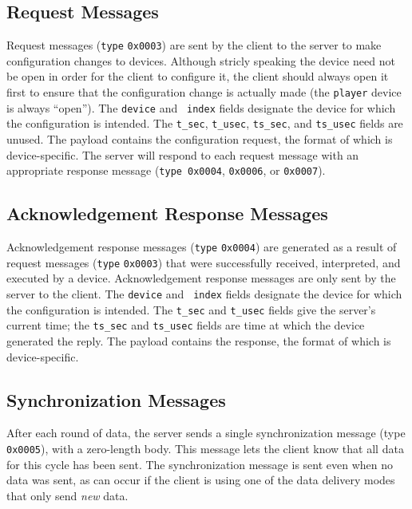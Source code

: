 \documentclass[11pt]{report}
\begin{document}
\subsection{Request Messages}
\label{sect:requestmessages}
Request messages ({\tt type} {\tt 0x0003}) are sent by the client to the server
to make configuration changes to devices.  Although stricly speaking the device
need not be open in order for the client to configure it, the client should
always open it first to ensure that the configuration change is actually made
(the {\tt player} device is always ``open'').  The {\tt device} and {\tt
index} fields designate the device for which the configuration is intended.
The {\tt t\_sec}, {\tt t\_usec}, {\tt ts\_sec}, and {\tt ts\_usec} fields
are unused.  The payload contains the configuration request, the format of
which is device-specific.  The server will respond to each request message
with an appropriate response message ({\tt type}\  {\tt 0x0004}, {\tt 0x0006},
or {\tt 0x0007}).


\subsection{Acknowledgement Response Messages}
\label{sect:ack-responsemessages}
Acknowledgement response messages ({\tt type} {\tt 0x0004}) are generated as
a result of request messages ({\tt type} {\tt 0x0003}) that were successfully
received, interpreted, and executed by a device.  Acknowledgement response
messages are only sent by the server to the client.  The {\tt device} and {\tt
index} fields designate the device for which the configuration is intended.
The {\tt t\_sec} and {\tt t\_usec} fields give the server's current time;
the {\tt ts\_sec} and {\tt ts\_usec} fields are time at which the device
generated the reply.  The payload contains the response, the format of which
is device-specific.

\subsection{Synchronization Messages}
\label{sect:synchmessage}
After each round of data, the server sends a single synchronization message
(type {\tt 0x0005}), with a zero-length body.  This message lets the client 
know that all data for this cycle has been sent.  The synchronization message 
is sent even when no data was sent, as can occur if the client is using one 
of the data delivery modes that only send {\em new} data.
\end{document}
